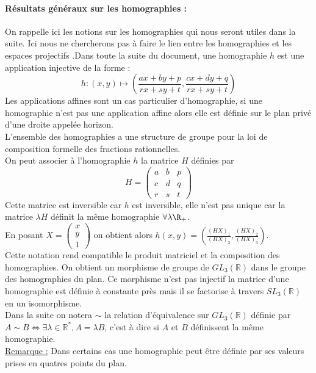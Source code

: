 \paragraph{Résultats généraux sur les homographies :}
 On rappelle ici les notions sur les homographies qui nous seront utiles dans la suite. Ici nous ne chercherons pas à faire le lien entre les homographies et les espaces projectifs .Dans toute la suite du document, une homographie $h$ est une application injective de la forme :
	\[h:(x,y)\mapsto \left(\frac{ax+by+p}{rx+sy+t},\frac{cx+dy+q}{rx+sy+t}\right)\]
Les applications affines sont un cas particulier d'homographie, si une homographie n'est pas une application affine alors elle est définie sur le plan privé d'une droite appelée horizon.\\	
  L'ensemble des homographies a une structure de groupe pour la loi de composition formelle des fractions rationnelles.\\
  On peut  associer à l'homographie $h$ la matrice $H$ définies par
	\begin{equation*}
	H=\begin{pmatrix}
	a&b&p\\c&d&q\\r&s&t
	\end{pmatrix}
	\end{equation*}
	Cette matrice est inversible car $h$ est inversible, elle n'est pas unique car la matrice $\lambda H$ définit la même homographie $\forall \lambda \R_+$.\\
	En posant $X=\begin{pmatrix}
	x\\y\\1
\end{pmatrix}$ on obtient alors $h(x,y)=\left(\frac{(HX)_{1}}{(HX)_{3}}	,\frac{(HX)_{2}}{(HX)_{3}}	\right)$.\\
Cette notation rend compatible le produit matriciel et la composition des homographies. On obtient un morphisme de groupe de $GL_{3}(\mathbb{R})$ dans le groupe des homographies du plan. Ce morphisme n'est pas injectif la matrice d'une homographie est définie à constante près mais il se factorise à travers $SL_{3}(\mathbb{R})$ en un isomorphisme.\\
Dans la suite on notera $\sim$ la relation d'équivalence  sur $GL_{3}(\mathbb{R})$ définie par $A\sim B \iff \exists \lambda\in \mathbb{R}^{*} , A=\lambda B$, c'est à dire si $A$ et $B$ définissent la même homographie.\\
\underline{Remarque :} Dans certains cas une homographie peut être définie par ses valeurs prises en quatres points du plan.\\




